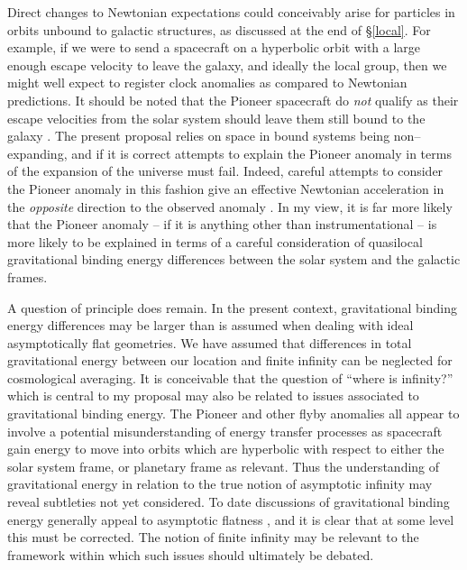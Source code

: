 \documentclass[12pt]{iopart}
\begin{document}
Direct changes to Newtonian expectations could conceivably arise for particles
in orbits unbound to galactic structures, as discussed at the end of
\S\ref{local}. For example, if we were to send a spacecraft on a hyperbolic
orbit with a large enough escape velocity to leave the galaxy, and ideally
the local group, then we might well expect to register clock anomalies
as compared to Newtonian predictions. It should be noted that the Pioneer
spacecraft do {\it not} qualify as their escape velocities from the solar
system should leave them still bound to the galaxy \cite{Slava}. The
present proposal relies on space in bound systems being non--expanding,
and if it is correct attempts to explain the Pioneer anomaly \cite{Pioneer}
in terms of the expansion of the universe must fail. Indeed, careful attempts
to consider the Pioneer anomaly in this fashion give an effective Newtonian
acceleration in the {\em opposite} direction to the observed anomaly
\cite{CG}. In my view, it is far more likely that the Pioneer anomaly -- if
it is anything other than instrumentational -- is more likely to be explained
in terms of a careful consideration of quasilocal gravitational binding
energy differences between the solar system and the galactic frames.

A question of principle does remain. In the present context, gravitational
binding energy differences may be larger than is assumed when dealing with
ideal asymptotically flat geometries. We
have assumed that differences in total gravitational energy between
our location and finite infinity can be neglected for cosmological averaging.
It is conceivable that the question of ``where is infinity?'' which is
central to my proposal may also be related to issues associated to
gravitational binding energy. The Pioneer and other flyby anomalies all
appear to involve a potential misunderstanding of energy transfer processes
\cite{transfer} as spacecraft gain energy to move into orbits which are
hyperbolic with respect to either the solar system frame, or planetary frame
as relevant. Thus the understanding
of gravitational energy in relation to the true notion of asymptotic
infinity may reveal subtleties not yet considered.
To date discussions of gravitational binding energy generally appeal to
asymptotic flatness \cite{KLB}, and it is clear that at some level this
must be corrected. The notion of finite infinity may be relevant to
the framework within which such issues should ultimately be debated.
\end{document}
